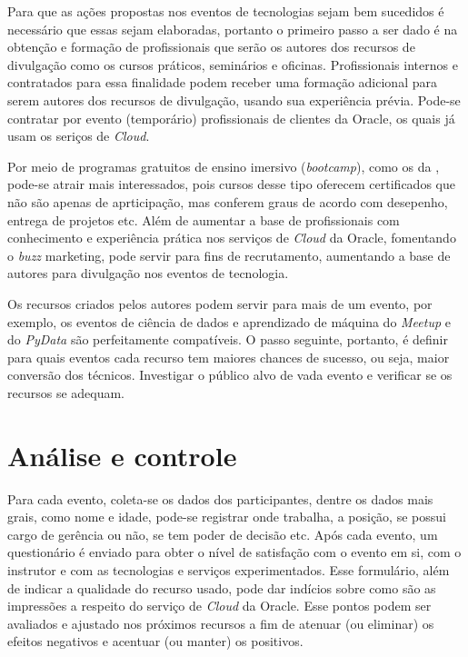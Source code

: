 \documentclass[a4paper]{article}
\begin{document}
Para que as ações propostas nos eventos de tecnologias sejam bem sucedidos é necessário que essas sejam elaboradas, portanto o primeiro passo a ser dado é na obtenção e formação de profissionais que serão os autores dos recursos de divulgação como os cursos práticos, seminários e oficinas. Profissionais internos e contratados para essa finalidade podem receber uma formação adicional para serem autores dos recursos de divulgação, usando sua experiência prévia. Pode-se contratar por evento (temporário) profissionais de clientes da Oracle, os quais já usam os seriços de \emph{Cloud}. 

Por meio de programas gratuitos de ensino imersivo (\emph{bootcamp}), como os da , pode-se atrair mais interessados, pois cursos desse tipo oferecem certificados que não são apenas de aprticipação, mas conferem graus de acordo com desepenho, entrega de projetos etc. Além de aumentar a base de profissionais com conhecimento e experiência prática nos serviços de \emph{Cloud} da Oracle, fomentando o \emph{buzz} marketing, pode servir para fins de recrutamento, aumentando a base de autores para divulgação nos eventos de tecnologia.

Os recursos criados pelos autores podem servir para mais de um evento, por exemplo, os eventos de ciência de dados e aprendizado de máquina do \emph{Meetup} e do \emph{PyData} são perfeitamente compatíveis. O passo seguinte, portanto, é definir para quais eventos cada recurso tem maiores chances de sucesso, ou seja, maior conversão dos técnicos. Investigar o público alvo de vada evento e verificar se os recursos se adequam.

\section{Análise e controle}

Para cada evento, coleta-se os dados dos participantes, dentre os dados mais grais, como nome e idade, pode-se registrar onde trabalha, a posição, se possui cargo de gerência ou não, se tem poder de decisão etc. Após cada evento, um questionário é enviado para obter o nível de satisfação com o evento em si, com o instrutor e com as tecnologias e serviços experimentados. Esse formulário, além de indicar a qualidade do recurso usado, pode dar indícios sobre como são as impressões a respeito do serviço de \emph{Cloud} da Oracle. Esse pontos podem ser avaliados e ajustado nos próximos recursos a fim de atenuar (ou eliminar) os efeitos negativos e acentuar (ou manter) os positivos.
\end{document}

